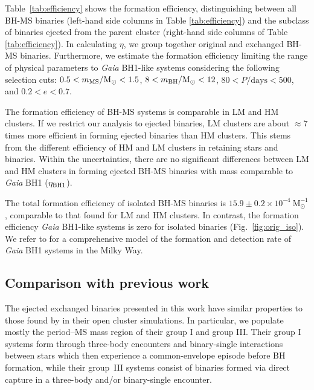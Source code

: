 \documentclass[fleqn,usenatbib]{mnras}
\newcommand{\bh}{\textit{Gaia} BH1}
\begin{document}
Table~\ref{tab:efficiency} shows the formation efficiency, distinguishing between all BH-MS binaries (left-hand side columns in Table \ref{tab:efficiency}) and the subclass of binaries ejected from the parent cluster (right-hand side columns of Table \ref{tab:efficiency}).  
In calculating $\eta{}$, we 
group together 
original and exchanged BH-MS binaries. 
Furthermore, we estimate the formation efficiency limiting the range of physical parameters to \bh{}-like systems considering the following selection cuts:
$ 0.5< m_{\rm{MS}}/\mathrm{M}_\odot  <1.5 $, $8< m_{\rm{BH}}/\mathrm{M}_\odot  <12$, $80 < P/\mathrm{days} < 500 $, and $0.2 < e < 0.7$.

The formation efficiency of BH-MS systems is  comparable in LM and HM clusters. 
If we restrict our analysis to ejected binaries, LM clusters are about $\approx7$ times more efficient in forming  
ejected binaries than HM clusters. 
This stems from the different efficiency of HM and LM clusters in retaining stars and binaries.  
Within the uncertainties, there are no significant differences between LM and HM clusters in forming ejected BH-MS binaries with mass comparable to \bh{} ($\eta_{\rm{BH1}}$).  
 

The total formation efficiency of isolated BH-MS binaries is 
$15.9\pm0.2 \times 10^{-4} \ \mathrm{M}^{-1}_\odot$, 
comparable to that found for LM and HM clusters. 
In contrast, the formation efficiency \bh{}-like systems 
is zero for isolated binaries (Fig.~\ref{fig:orig_iso}). 
We refer to \cite{DiCarlo2023} for a comprehensive model of the formation and detection rate of \bh{} systems in the Milky Way.


\subsection{Comparison with previous work} 


The ejected exchanged binaries presented in this work have similar properties 
to those found by \citet{shikauchi2020} in their open cluster simulations. In particular, we populate mostly the period--MS mass region of their group I and group III. Their group I systems form through three-body encounters and binary-single interactions between stars which then experience a common-envelope episode before BH formation, while their group~III systems consist of binaries formed via direct capture in a three-body and/or binary-single encounter. 
\end{document}
